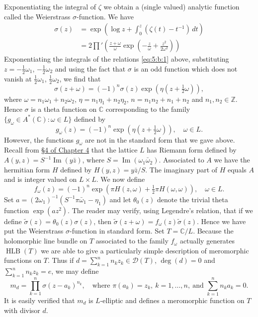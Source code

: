 Exponentiating the integral of $\zeta$ we obtain a (single valued) analytic function called the Weierstrass $\sigma$-function. We have
\[\begin{split}
\sigma(z)&=\exp\left(\log z+\int_0^z(\zeta(t)-t^{-1})\,dt\right)\\
&=2\prod{}'\left(\frac{z+\omega}{\omega}\exp\left(-\frac z\omega+\frac{z^2}{2\omega^2}\right)\right)
\end{split}\]
Exponentiating the integrals of the relations \eqref{eq:5:b:1} above, substituting $z=-\tfrac12\omega_1$, $-\tfrac12\omega_2$ and using the fact that $\sigma$ is an odd function which does not vanish at $\tfrac12\omega_1$, $\tfrac12\omega_2$, we find that
\[\sigma(z+\omega)=(-1)^n\sigma(z)\exp(\eta(z+\tfrac12\omega)),\]
where $\omega=n_1\omega_1+n_2\omega_2$, $\eta=n_1\eta_1+n_2\eta_2$, $n=n_1n_2+n_1+n_2$ and $n_1,n_2\in\mathbb Z$. Hence $\sigma$ is a theta function on $\mathbb C$ corresponding to the family $\{g_\omega\in A^*(\mathbb C):\omega\in L\}$ defined by
\[g_\omega(z)=(-1)^n\exp(\eta(z+\tfrac12\omega)),\quad\omega\in L.\]
However, the functions $g_\omega$ are not in the standard form that we gave above. Recall from \hyperref[sec:4:4]{\S4 of Chapter 4} that the lattice $L$ has Riemann form defined by $A(y,z)=S^{-1}\operatorname{Im}(y\bar z)$, where $S=\operatorname{Im}(\omega_1\bar\omega_2)$. Associated to $A$ we have the hermitian form $H$ defined by $H(y,z)=y\bar z/S$. The imaginary part of $H$ equals $A$ and is integer valued on $L\times L$. We now define
\[f_\omega(z)=(-1)^n\exp(\pi H(z,\omega)+\tfrac12\pi H(\omega,\omega)),\quad\omega\in L.\]
Set $a=(2\omega_1)^{-1}(S^{-1}\pi\bar\omega_1-\eta_1)$ and let $\theta_0(z)$ denote the trivial theta function $\exp(az^2)$. The reader may verify, using Legendre's relation, that if we define $\widetilde\sigma(z)=\theta_0(z)\sigma(z)$, then $\widetilde\sigma(z+\omega)=f_\omega(z)\widetilde\sigma(z)$. Hence we have put the Weierstrass $\sigma$-function in standard form. Set $T=\mathbb C/L$. Because the holomorphic line bundle on $T$ associated to the family $f_\omega$ actually generates $\operatorname{HLB}(T)$ we are able to give a particularly simple description of meromorphic functions on $T$. Thus if $d=\sum_{k=1}^nn_kz_k\in\mathcal D(T)$, $\deg(d)=0$ and $\sum_{k=1}^nn_kz_k=e$, we may define
\[m_d=\prod_{k=1}^n\sigma(z-a_k)^{n_k},\quad\text{where }\pi(a_k)=z_k,\ k=1,\ldots,n,\ \text{and }\sum_{k=1}^nn_ka_k=0.\]
It is easily verified that $m_d$ is $L$-elliptic and defines a meromorphic function on $T$ with divisor $d$.

